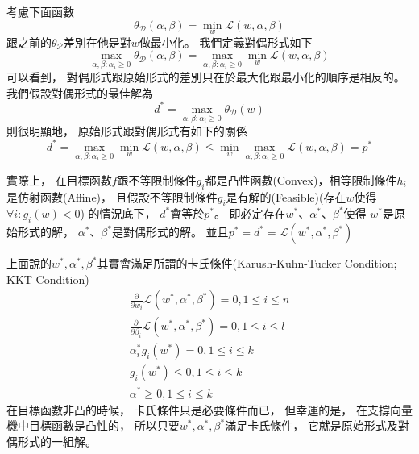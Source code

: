   考慮下面函數
  \begin{equation}
    \theta_{\mathcal{D}}(\alpha, \beta) = \min_w \mathcal{L}(w, \alpha, \beta)    
  \end{equation}    
  跟之前的$\theta_{\mathcal{P}}$差別在他是對$w$做最小化。
  我們定義對偶形式如下
  \begin{equation}
    \max_{\alpha, \beta: \alpha_i \geq 0} \theta_{\mathcal{D}}(\alpha, \beta) = \max_{\alpha, \beta: \alpha_i \geq 0} \min_w \mathcal{L}(w, \alpha, \beta)    
  \end{equation}    
  可以看到，
  對偶形式跟原始形式的差別只在於最大化跟最小化的順序是相反的。
  我們假設對偶形式的最佳解為
  \begin{equation}
    d^{*} = \max_{\alpha, \beta: \alpha_i \geq 0} \theta_{\mathcal{D}}(w)
  \end{equation}    
  則很明顯地，
  原始形式跟對偶形式有如下的關係
  \begin{equation}
    d^{*} = \max_{\alpha, \beta: \alpha_i \geq 0} \min_w \mathcal{L}(w, \alpha, \beta) \leq \min_w \max_{\alpha, \beta: \alpha_i \geq 0} \mathcal{L}(w, \alpha, \beta) = p^{*}
  \end{equation}

  實際上，
  在目標函數$f$跟不等限制條件$g_i$都是凸性函數(Convex)，相等限制條件$h_i$是仿射函數(Affine)，
  且假設不等限制條件$g_i$是有解的(Feasible)(存在$w$使得$\forall i: g_i(w) < 0$)
  的情況底下，
  $d^{*}$會等於$p^{*}$。
  即必定存在$w^{*}$、$\alpha^{*}$、$\beta^{*}$使得
  $w^{*}$是原始形式的解，
  $\alpha^{*}$、$\beta^{*}$是對偶形式的解。
  並且$p^{*} = d^{*} = \mathcal{L}(w^{*}, \alpha^{*}, \beta^{*})$

  上面說的$w^{*}, \alpha^{*}, \beta^{*}$其實會滿足所謂的卡氏條件(Karush-Kuhn-Tucker Condition; KKT Condition)
  \begin{align}
    \frac{\partial}{\partial w_i} \mathcal{L}(w^{*}, \alpha^{*}, \beta^{*}) = 0, 1 \leq i \leq n \\
    \frac{\partial}{\partial \beta_i} \mathcal{L}(w^{*}, \alpha^{*}, \beta^{*}) = 0, 1 \leq i \leq l\\
    \alpha_i^{*} g_i (w^{*}) = 0, 1 \leq i \leq k \label{kkt_complement}\\
    g_i(w^{*}) \leq 0, 1 \leq i \leq k \\
    \alpha^{*} \geq 0, 1 \leq i \leq k  
  \end{align}
  在目標函數非凸的時候，
  卡氏條件只是必要條件而已，
  但幸運的是，
  在支撐向量機中目標函數是凸性的，
  所以只要$w^{*}, \alpha^{*}, \beta^{*}$滿足卡氏條件，
  它就是原始形式及對偶形式的一組解。

